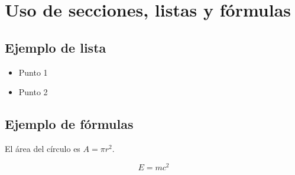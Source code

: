 \documentclass[12pt,a4paper]{article}
\begin{document}
\section{Uso de secciones, listas y fórmulas}
\subsection{Ejemplo de lista}
\begin{itemize}
    \item Punto 1
    \item Punto 2
\end{itemize}

\subsection{Ejemplo de fórmulas}
El área del círculo es $A = \pi r^2$.

\[
E = mc^2
\]
\end{document}
